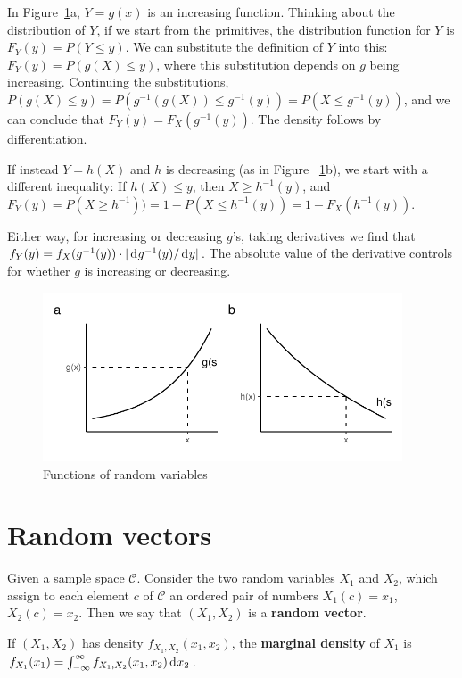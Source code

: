 \documentclass[twoside]{article}
\begin{document}
In Figure~\ref{fig:frv}a, $Y=g(x)$ is an increasing function. 
Thinking about the distribution of $Y$, if we start from the primitives,
the distribution function for $Y$ is $F_Y(y) = P(Y\leq y)$. We can substitute
the definition of $Y$ into this: $F_Y(y) = P(g(X)\leq y)$, where this
substitution depends on $g$ being increasing. Continuing
the substitutions, $P(g(X) \leq y) = P( g^{-1}(g(X)) \leq g^{-1}(y)) = P(X\leq g^{-1}(y))$,
and we can conclude that $F_Y(y)= F_X(g^{-1}(y))$. The density follows by differentiation.

If instead $Y=h(X)$ and $h$ is decreasing (as in Figure ~\ref{fig:frv}b), we
start with a different inequality: If $h(X) \leq y$, then $X\geq h^{-1}(y)$,
and $F_Y(y) = P(X\geq h^{-1})) = 1 - P(X\leq h^{-1}(y)) = 1 - F_X(h^{-1}(y))$.

Either way, for increasing or decreasing $g$'s, taking derivatives we find that 
$f_Y(y) = f_X(g^{-1}(y)) \cdot | \rd g^{-1}(y)/\rd y|$.
The absolute value of the derivative controls for whether $g$ is increasing or decreasing.


\begin{figure}[tb]
\includegraphics[width=0.95\textwidth]{../graphs/transformation_of_RV}

\caption{Functions of random variables}\label{fig:frv}
\end{figure}



\section{Random vectors}
Given a sample space $\mathcal{C}$. Consider the
two random variables $X_1$ and $X_2$, which assign to each element
$c$ of $\mathcal{C}$ an ordered pair of numbers
$X_1(c)=x_1$, $X_2(c)=x_2$. Then we say that $(X_1,X_2)$ is a
\textbf{random vector}. 

If $(X_1,X_2)$ has density $f_{X_1,X_2}(x_1,x_2)$, the \textbf{marginal density}
of $X_1$ is  $ f_{X_1}(x_1) = \int_{-\infty}^\infty f_{X_1,X_2}(x_1,x_2)\rd x_2$.
\end{document}
